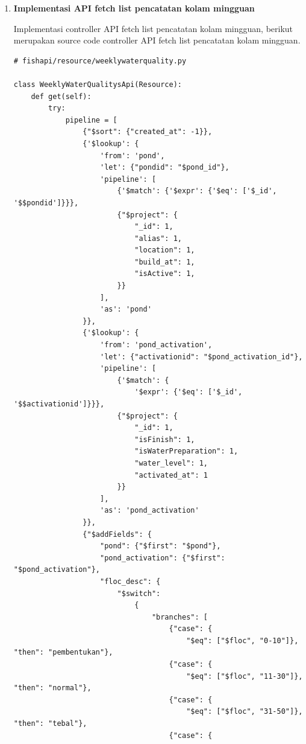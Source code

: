 \begin{enumerate}[1.]
\item \textbf{Implementasi API fetch list pencatatan kolam mingguan}

Implementasi controller API fetch list pencatatan kolam mingguan, berikut merupakan source code controller API fetch list pencatatan kolam mingguan.

\begin{lstlisting}
# fishapi/resource/weeklywaterquality.py

class WeeklyWaterQualitysApi(Resource):
    def get(self):
        try:
            pipeline = [
                {"$sort": {"created_at": -1}},
                {'$lookup': {
                    'from': 'pond',
                    'let': {"pondid": "$pond_id"},
                    'pipeline': [
                        {'$match': {'$expr': {'$eq': ['$_id', '$$pondid']}}},
                        {"$project": {
                            "_id": 1,
                            "alias": 1,
                            "location": 1,
                            "build_at": 1,
                            "isActive": 1,
                        }}
                    ],
                    'as': 'pond'
                }},
                {'$lookup': {
                    'from': 'pond_activation',
                    'let': {"activationid": "$pond_activation_id"},
                    'pipeline': [
                        {'$match': {
                            '$expr': {'$eq': ['$_id', '$$activationid']}}},
                        {"$project": {
                            "_id": 1,
                            "isFinish": 1,
                            "isWaterPreparation": 1,
                            "water_level": 1,
                            "activated_at": 1
                        }}
                    ],
                    'as': 'pond_activation'
                }},
                {"$addFields": {
                    "pond": {"$first": "$pond"},
                    "pond_activation": {"$first": "$pond_activation"},
                    "floc_desc": {
                        "$switch":
                            {
                                "branches": [
                                    {"case": {
                                        "$eq": ["$floc", "0-10"]}, "then": "pembentukan"},
                                    {"case": {
                                        "$eq": ["$floc", "11-30"]}, "then": "normal"},
                                    {"case": {
                                        "$eq": ["$floc", "31-50"]}, "then": "tebal"},
                                    {"case": {

\end{lstlisting}
\end{enumerate}
